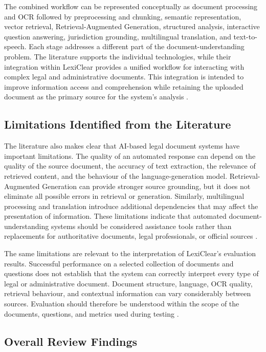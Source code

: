 \documentclass[12pt,a4paper,oneside]{report}
\begin{document}
The combined workflow can be represented conceptually as document processing
and OCR followed by preprocessing and chunking, semantic representation,
vector retrieval, Retrieval-Augmented Generation, structured analysis,
interactive question answering, jurisdiction grounding, multilingual
translation, and text-to-speech. Each stage addresses a different part of
the document-understanding problem. The literature supports the individual
technologies, while their integration within LexiClear provides a unified
workflow for interacting with complex legal and administrative documents.
This integration is intended to improve information access and comprehension
while retaining the uploaded document as the primary source for the
system's analysis
\cite{pramanik2025,jurisai2025,lewis2020rag}.

\subsection{Limitations Identified from the Literature}

The literature also makes clear that AI-based legal document systems have
important limitations. The quality of an automated response can depend on the
quality of the source document, the accuracy of text extraction, the
relevance of retrieved content, and the behaviour of the language-generation
model. Retrieval-Augmented Generation can provide stronger source grounding,
but it does not eliminate all possible errors in retrieval or generation.
Similarly, multilingual processing and translation introduce additional
dependencies that may affect the presentation of information. These
limitations indicate that automated document-understanding systems should be
considered assistance tools rather than replacements for authoritative
documents, legal professionals, or official sources
\cite{lewis2020rag,es2024ragas}.

The same limitations are relevant to the interpretation of LexiClear's
evaluation results. Successful performance on a selected collection of
documents and questions does not establish that the system can correctly
interpret every type of legal or administrative document. Document structure,
language, OCR quality, retrieval behaviour, and contextual information can
vary considerably between sources. Evaluation should therefore be understood
within the scope of the documents, questions, and metrics used during testing \cite{chalkidis2022lexglue,es2024ragas}.

\subsection{Overall Review Findings}
\end{document}
